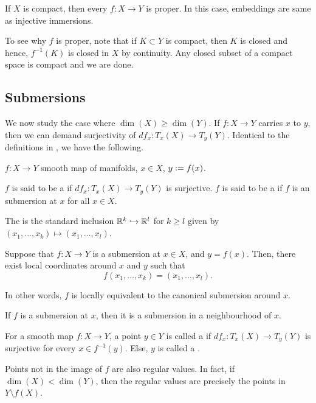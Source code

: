 \begin{rem} \label{rem:compact-injective-immersion-embedding}
	If $X$ is compact, then every $f : X \to Y$ is proper. In this case, embeddings are same as injective immersions.

	To see why $f$ is proper, note that if $K \subset Y$ is compact, then $K$ is closed and hence, $f^{-1}(K)$ is closed in $X$ by continuity. Any closed subset of a compact space is compact and we are done.
\end{rem}

\subsection{Submersions}

We now study the case where $\dim(X) \ge \dim(Y)$. If $f : X \to Y$ carries $x$ to $y$, then we can demand surjectivity of $df_{x} : T_{x}(X) \to T_{y}(Y)$. Identical to the definitions in , we have the following.

\begin{defn} 
	$f : X \to Y$ smooth map of manifolds, $x \in X$, $y \vcentcolon= f(x)$.

	$f$ is said to be a  if $df_{x} : T_{x}(X) \to T_{y}(Y)$ is surjective. \newline
	$f$ is said to be a  if $f$ is an submersion at $x$ for all $x \in X$. 

	The  is the standard inclusion $\mathbb{R}^{k} \hookrightarrow \mathbb{R}^{l}$ for $k \ge l$ given by $(x_{1}, \ldots, x_{k}) \mapsto (x_{1}, \ldots, x_{l})$.
\end{defn}

\begin{thm}
	Suppose that $f : X \to Y$ is a submersion at $x \in X$, and $y = f(x)$. Then, there exist local coordinates around $x$ and $y$ such that
	\begin{equation*} 
		f(x_{1}, \ldots, x_{k}) = (x_{1}, \ldots, x_{l}).
	\end{equation*}

	In other words, $f$ is locally equivalent to the canonical submersion around $x$.
\end{thm}

\begin{cor}
	If $f$ is a submersion at $x$, then it is a submersion in a neighbourhood of $x$.
\end{cor}

\begin{defn}
	For a smooth map $f : X \to Y$, a point $y \in Y$ is called a  if $df_{x} : T_{x}(X) \to T_{y}(Y)$ is surjective for every $x \in f^{-1}(y)$. Else, $y$ is called a .
\end{defn}
Points not in the image of $f$ are also regular values. In fact, if $\dim(X) < \dim(Y)$, then the regular values are precisely the points in $Y \setminus f(X)$.

